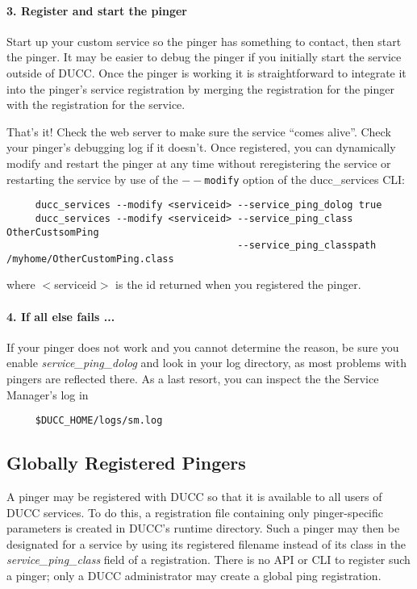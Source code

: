       \paragraph{3. Register and start the pinger} Start up your custom service so the pinger has something to contact, then start
      the pinger.  It may be easier to debug the pinger if you initially start the service outside of DUCC. Once
      the pinger is working it is straightforward to integrate it into the pinger's service registration by merging
      the registration for the pinger with the registration for the service.

      That's it!  Check the web server to make sure the service ``comes alive''.  Check your pinger's
      debugging log if it doesn't.  Once registered, you can dynamically modify and restart the pinger at any time without
      reregistering the service or restarting the service by use of the {\tt $--$modify} option of the
      ducc\_services CLI:
\begin{verbatim}
     ducc_services --modify <serviceid> --service_ping_dolog true
     ducc_services --modify <serviceid> --service_ping_class OtherCustsomPing
                                        --service_ping_classpath /myhome/OtherCustomPing.class

\end{verbatim}
     where $<$serviceid$>$ is the id returned when you registered the pinger.

     \paragraph{4. If all else fails ...}
     If your pinger does not work and you cannot determine the reason, be sure you enable {\em service\_ping\_dolog} and
     look in your log directory, as most problems with pingers are reflected there.  As a last resort, you can
     inspect the the Service Manager's log in
\begin{verbatim}
     $DUCC_HOME/logs/sm.log
\end{verbatim}
     
    \subsection{Globally Registered Pingers}
    \label{subsec:services.pingers}

    A pinger may be registered with DUCC so that it is available to all users of DUCC services.  To do 
    this, a registration file containing only pinger-specific parameters is created in DUCC's runtime
    directory.   Such a pinger may then be designated for a service by using its registered filename
    instead of its class in the {\em service\_ping\_class} field of a registration.  There is no API or
    CLI to register such a pinger; only a DUCC administrator may create a global ping registration.

